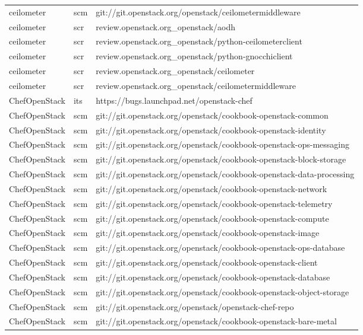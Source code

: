 \begin{center}
\begin{longtable}{|p{4cm}|p{1cm}|p{10cm}|}
ceilometer&scm&git://git.openstack.org/openstack/ceilometermiddleware\\ 
ceilometer&scr&review.openstack.org\_openstack/aodh\\ 
ceilometer&scr&review.openstack.org\_openstack/python-ceilometerclient\\ 
ceilometer&scr&review.openstack.org\_openstack/python-gnocchiclient\\ 
ceilometer&scr&review.openstack.org\_openstack/ceilometer\\ 
ceilometer&scr&review.openstack.org\_openstack/ceilometermiddleware\\ 
ChefOpenStack&its&https://bugs.launchpad.net/openstack-chef\\ 
ChefOpenStack&scm&git://git.openstack.org/openstack/cookbook-openstack-common\\ 
ChefOpenStack&scm&git://git.openstack.org/openstack/cookbook-openstack-identity\\ 
ChefOpenStack&scm&git://git.openstack.org/openstack/cookbook-openstack-ops-messaging\\ 
ChefOpenStack&scm&git://git.openstack.org/openstack/cookbook-openstack-block-storage\\ 
ChefOpenStack&scm&git://git.openstack.org/openstack/cookbook-openstack-data-processing\\ 
ChefOpenStack&scm&git://git.openstack.org/openstack/cookbook-openstack-network\\ 
ChefOpenStack&scm&git://git.openstack.org/openstack/cookbook-openstack-telemetry\\ 
ChefOpenStack&scm&git://git.openstack.org/openstack/cookbook-openstack-compute\\ 
ChefOpenStack&scm&git://git.openstack.org/openstack/cookbook-openstack-image\\ 
ChefOpenStack&scm&git://git.openstack.org/openstack/cookbook-openstack-ops-database\\ 
ChefOpenStack&scm&git://git.openstack.org/openstack/cookbook-openstack-client\\ 
ChefOpenStack&scm&git://git.openstack.org/openstack/cookbook-openstack-database\\ 
ChefOpenStack&scm&git://git.openstack.org/openstack/cookbook-openstack-object-storage\\ 
ChefOpenStack&scm&git://git.openstack.org/openstack/openstack-chef-repo\\ 
ChefOpenStack&scm&git://git.openstack.org/openstack/cookbook-openstack-bare-metal\\ 

\end{longtable}
\end{center}
